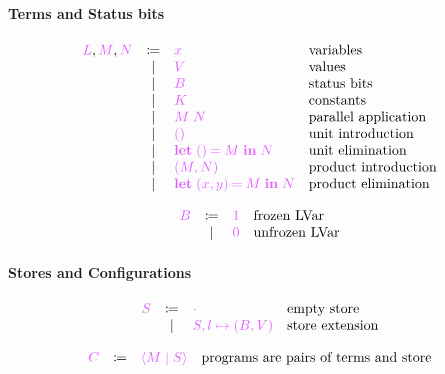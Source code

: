 \documentclass[main.tex]{subfiles}
\begin{document}
\paragraph{Terms and Status bits}
\[
\begin{array}{lcll}
  \tm{L}, \tm{M}, \tm{N}
  & \coloneqq & \tm{x}                        & \text{variables} \\
  & \sep      & \tm{V}                        & \text{values} \\
  & \sep      & \tm{B}                        & \text{status bits}\\
  & \sep      & \tm{K}                        & \text{constants} \\                                              
  & \sep      & \tm{M\;N}                     & \text{parallel application} \\
  & \sep      & \tm{\unit}                    & \text{unit introduction} \\
  & \sep      & \tm{\letunit{M}{N}}           & \text{unit elimination} \\
  & \sep      & \tm{\pair{M}{N}}              & \text{product introduction} \\
  & \sep      & \tm{\letpair{x}{y}{M}{N}}     & \text{product elimination}\\
\end{array}
\]

\[
\begin{array}{lcll}
  \tm{B}
  & \coloneqq & \tm{1}                        & \text{frozen LVar} \\
  & \sep      & \tm{0}                        & \text{unfrozen LVar} \\
\end{array}
\]

\paragraph{Stores and Configurations}
\[
\begin{array}{lcll}
  \tm{S}
  & \coloneqq & \tm{\emptyenv}                & \text{empty store} \\
  & \sep      & \tm{S, l \mapsto (B, V)}      & \text{store extension} \\
  \end{array}
\]

\[
\begin{array}{lcll}
  \tm{C}
  & \coloneqq & \tm{\config{M}{S}}            & \text{programs are pairs of
                                                    terms and store} \\
  \end{array}
\]
\end{document}
